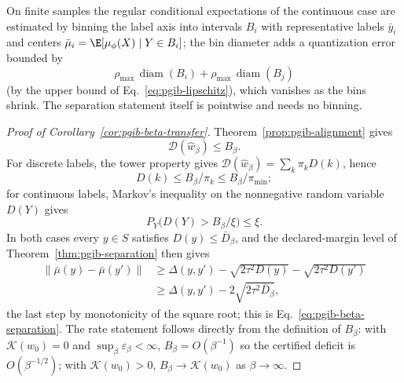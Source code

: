 \begin{remark}
\label{rem:pgib-binning}
On finite samples the regular conditional expectations of the continuous case are
estimated by
binning the label axis into intervals $B_i$ with representative labels $\bar y_i$
and centers $\bar\mu_i = \E[\mu_\phi(X) \mid Y \in B_i]$; the bin diameter adds a
quantization error bounded by
\begin{equation*}
\rho_{\max}\,\operatorname{diam}(B_i) + \rho_{\max}\,\operatorname{diam}(B_j)
\end{equation*}
(by the upper bound of Eq.~\eqref{eq:pgib-lipschitz}), which vanishes as the bins
shrink. The separation statement itself is pointwise and needs no binning.
\end{remark}

\begin{proof}[Proof of Corollary~\ref{cor:pgib-beta-transfer}]
Theorem~\ref{prop:pgib-alignment} gives
\begin{equation*}
\mathcal D(\widehat w_\beta)\le B_\beta.
\end{equation*}
For discrete labels, the tower property gives
$\mathcal D(\widehat w_\beta)=\sum_k\pi_kD(k)$, hence
\begin{equation*}
D(k)\le B_\beta/\pi_k\le B_\beta/\pi_{\min};
\end{equation*}
for continuous labels, Markov's inequality on the nonnegative random variable
$D(Y)$ gives
\begin{equation*}
P_Y\bigl(D(Y)>B_\beta/\xi\bigr)\le\xi.
\end{equation*}
In both cases every $y\in S$ satisfies $D(y)\le\bar D_\beta$, and the
declared-margin level of Theorem~\ref{thm:pgib-separation} then gives
\begin{equation*}
\begin{aligned}
\|\bar\mu(y)-\bar\mu(y')\|
&\ge \Delta(y,y')-\sqrt{2\tau^2D(y)}-\sqrt{2\tau^2D(y')}\\
&\ge \Delta(y,y')-2\sqrt{2\tau^2\bar D_\beta},
\end{aligned}
\end{equation*}
the last step by monotonicity of the square root; this is
Eq.~\eqref{eq:pgib-beta-separation}. The rate statement follows
directly from the definition of $B_\beta$: with $\mathcal K(w_0)=0$ and
$\sup_\beta\varepsilon_\beta<\infty$, $B_\beta=O(\beta^{-1})$ so the certified
deficit is $O(\beta^{-1/2})$; with $\mathcal K(w_0)>0$,
$B_\beta\to\mathcal K(w_0)$ as $\beta\to\infty$.
\end{proof}

